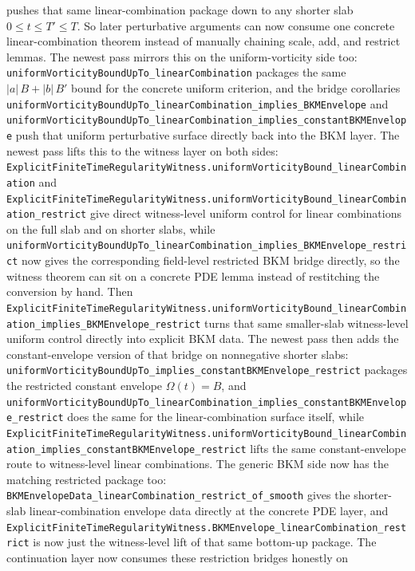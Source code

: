 \documentclass[11pt]{article}
\begin{document}
pushes that same linear-combination package down to any shorter slab
\(0 \le t \le T' \le T\).  So later perturbative arguments can now consume one
concrete linear-combination theorem instead of manually chaining scale, add,
and restrict lemmas.  The newest pass mirrors this on the uniform-vorticity
side too:
\texttt{uniformVorticityBoundUpTo\_linearCombination} packages the same
\(|a|\,B + |b|\,B'\) bound for the concrete uniform criterion, and the bridge
corollaries
\texttt{uniformVorticityBoundUpTo\_linearCombination\_implies\_BKMEnvelope} and
\texttt{uniformVorticityBoundUpTo\_linearCombination\_implies\_constantBKMEnvelope}
push that uniform perturbative surface directly back into the BKM layer.  The
newest pass lifts this to the witness layer on both sides:
\texttt{ExplicitFiniteTimeRegularityWitness.uniformVorticityBound\_linearCombination}
and
\texttt{ExplicitFiniteTimeRegularityWitness.uniformVorticityBound\_linearCombination\_restrict}
give direct witness-level uniform control for linear combinations on the full
slab and on shorter slabs, while
\texttt{uniformVorticityBoundUpTo\_linearCombination\_implies\_BKMEnvelope\_restrict}
now gives the corresponding field-level restricted BKM bridge directly, so the
witness theorem can sit on a concrete PDE lemma instead of restitching the
conversion by hand.  Then
\texttt{ExplicitFiniteTimeRegularityWitness.uniformVorticityBound\_linearCombination\_implies\_BKMEnvelope\_restrict}
turns that same smaller-slab witness-level uniform control directly into
explicit BKM data.  The newest pass then adds the constant-envelope version of
that bridge on nonnegative shorter slabs:
\texttt{uniformVorticityBoundUpTo\_implies\_constantBKMEnvelope\_restrict}
packages the restricted constant envelope \( \Omega(t)=B \), and
\texttt{uniformVorticityBoundUpTo\_linearCombination\_implies\_constantBKMEnvelope\_restrict}
does the same for the linear-combination surface itself, while
\texttt{ExplicitFiniteTimeRegularityWitness.uniformVorticityBound\_linearCombination\_implies\_constantBKMEnvelope\_restrict}
lifts the same constant-envelope route to witness-level linear combinations.
The generic BKM side now has the matching restricted package too:
\texttt{BKMEnvelopeData\_linearCombination\_restrict\_of\_smooth} gives the
shorter-slab linear-combination envelope data directly at the concrete PDE
layer, and
\texttt{ExplicitFiniteTimeRegularityWitness.BKMEnvelope\_linearCombination\_restrict}
is now just the witness-level lift of that same bottom-up package.
The continuation layer now consumes these restriction bridges honestly on
\end{document}
